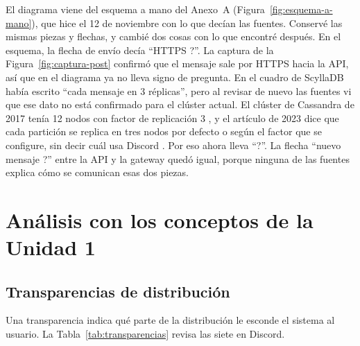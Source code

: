 \documentclass[11pt,a4paper]{article}
\begin{document}
El diagrama viene del esquema a mano del Anexo~A (Figura~\ref{fig:esquema-a-mano}), que hice el 12 de noviembre con lo que decían las fuentes. Conservé las mismas piezas y flechas, y cambié dos cosas con lo que encontré después. En el esquema, la flecha de envío decía \enquote{HTTPS ?}. La captura de la Figura~\ref{fig:captura-post} confirmó que el mensaje sale por HTTPS hacia la API, así que en el diagrama ya no lleva signo de pregunta. En el cuadro de ScyllaDB había escrito \enquote{cada mensaje en 3 réplicas}, pero al revisar de nuevo las fuentes vi que ese dato no está confirmado para el clúster actual. El clúster de Cassandra de 2017 tenía 12 nodos con factor de replicación 3 \cite{Vishnevskiy2017billions}, y el artículo de 2023 dice que cada partición se replica en tres nodos por defecto o según el factor que se configure, sin decir cuál usa Discord \cite{Ingram2023}. Por eso ahora lleva \enquote{?}. La flecha \enquote{nuevo mensaje ?} entre la API y la gateway quedó igual, porque ninguna de las fuentes explica cómo se comunican esas dos piezas.

\section{Análisis con los conceptos de la Unidad 1}\label{sec:unidad1}

\subsection{Transparencias de distribución}

Una transparencia indica qué parte de la distribución le esconde el sistema al usuario. La Tabla~\ref{tab:transparencias} revisa las siete en Discord.
\end{document}
